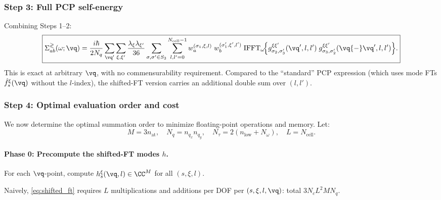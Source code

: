 \subsubsection{Step 3: Full PCP self-energy}
\label{sssub:step3}

Combining Steps 1--2:
\begin{equation}\label{eq:sigma_pcp_full}
  \boxed{
  \Sigma^{\gtrless}_{ab}(\omega;\vq)
  = \frac{i\hbar}{2N_q}
    \sum_{\vq'}
    \sum_{\xi,\xi'} \frac{\lambda_\xi\lambda_{\xi'}}{36}
    \sum_{\sigma,\sigma' \in S_3}
    \sum_{l,l'=0}^{N_\mathrm{cell}-1}
    w_a^{(\sigma_1,\xi,l)}\; w_b^{(\sigma'_1,\xi',l')}
    \;\mathrm{IFFT}_\omega\!\Bigl\{
      g_{\sigma_2,\sigma'_3}^{\xi\xi'}(\vq',l,l')\;
      g_{\sigma_3,\sigma'_2}^{\xi\xi'}(\vq{-}\vq',l,l')
    \Bigr\}.
  }
\end{equation}
This is exact at arbitrary $\vq$, with no commensurability
requirement.  Compared to the ``standard'' PCP expression
(which uses mode FTs $\hat f_s^\xi(\vq)$ without the $l$-index),
the shifted-FT version carries an additional double sum over
$(l, l')$.


\subsubsection{Step 4: Optimal evaluation order and cost}
\label{sssub:step4}

We now determine the optimal summation order to minimize
floating-point operations and memory.  Let:
\begin{equation*}
  M = 3 n_\mathrm{at},\quad
  N_q = n_{q_x} n_{q_y},\quad
  N_\tau = 2(n_\mathrm{low} + N_\omega),\quad
  L = N_\mathrm{cell}.
\end{equation*}

\paragraph{Phase 0: Precompute the shifted-FT modes $h$.}

For each $\vq$-point, compute
$h_s^{\xi}(\vq, l) \in \CC^M$ for all $(s, \xi, l)$.

Naively, \cref{eq:shifted_ft} requires $L$ multiplications and
additions per DOF per $(s, \xi, l, \vq)$: total
$3 N_c L^2 M N_q$.

